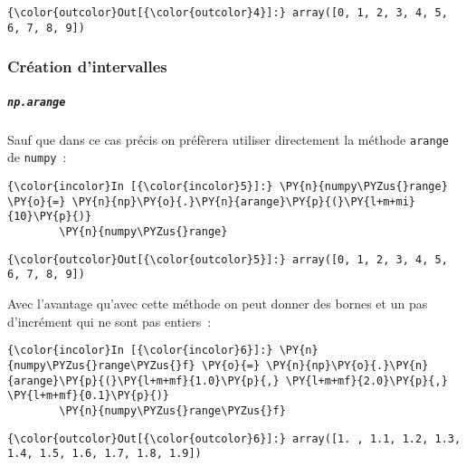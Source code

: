 \begin{Verbatim}[commandchars=\\\{\},frame=single,framerule=0.3mm,rulecolor=\color{cellframecolor}]
{\color{outcolor}Out[{\color{outcolor}4}]:} array([0, 1, 2, 3, 4, 5, 6, 7, 8, 9])
\end{Verbatim}
            
    \hypertarget{cruxe9ation-dintervalles}{%
\subsubsection{Création d'intervalles}\label{cruxe9ation-dintervalles}}

    \hypertarget{np.arange}{%
\subparagraph{\texorpdfstring{\texttt{np.arange}}{np.arange}}\label{np.arange}}

    Sauf que dans ce cas précis on préfèrera utiliser directement la méthode
\texttt{arange} de \texttt{numpy}~:

    \begin{Verbatim}[commandchars=\\\{\},frame=single,framerule=0.3mm,rulecolor=\color{cellframecolor}]
{\color{incolor}In [{\color{incolor}5}]:} \PY{n}{numpy\PYZus{}range} \PY{o}{=} \PY{n}{np}\PY{o}{.}\PY{n}{arange}\PY{p}{(}\PY{l+m+mi}{10}\PY{p}{)}
        \PY{n}{numpy\PYZus{}range}
\end{Verbatim}


\begin{Verbatim}[commandchars=\\\{\},frame=single,framerule=0.3mm,rulecolor=\color{cellframecolor}]
{\color{outcolor}Out[{\color{outcolor}5}]:} array([0, 1, 2, 3, 4, 5, 6, 7, 8, 9])
\end{Verbatim}
            
    Avec l'avantage qu'avec cette méthode on peut donner des bornes et un
pas d'incrément qui ne sont pas entiers~:

    \begin{Verbatim}[commandchars=\\\{\},frame=single,framerule=0.3mm,rulecolor=\color{cellframecolor}]
{\color{incolor}In [{\color{incolor}6}]:} \PY{n}{numpy\PYZus{}range\PYZus{}f} \PY{o}{=} \PY{n}{np}\PY{o}{.}\PY{n}{arange}\PY{p}{(}\PY{l+m+mf}{1.0}\PY{p}{,} \PY{l+m+mf}{2.0}\PY{p}{,} \PY{l+m+mf}{0.1}\PY{p}{)}
        \PY{n}{numpy\PYZus{}range\PYZus{}f}
\end{Verbatim}


\begin{Verbatim}[commandchars=\\\{\},frame=single,framerule=0.3mm,rulecolor=\color{cellframecolor}]
{\color{outcolor}Out[{\color{outcolor}6}]:} array([1. , 1.1, 1.2, 1.3, 1.4, 1.5, 1.6, 1.7, 1.8, 1.9])
\end{Verbatim}
            

